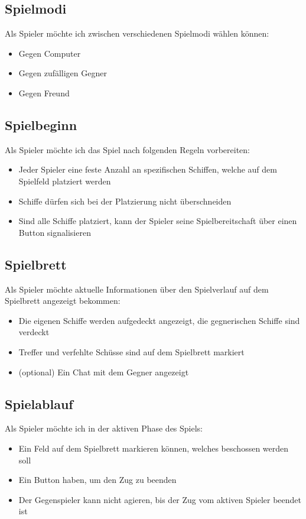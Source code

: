 \documentclass[a4paper, 10pt, conference]{IEEEtran}
\begin{document}
\subsection{Spielmodi}
Als Spieler möchte ich zwischen verschiedenen Spielmodi wählen können:
\begin{itemize}
	\item Gegen Computer
	\item Gegen zufälligen Gegner
	\item Gegen Freund
\end{itemize}

\subsection{Spielbeginn}
Als Spieler möchte ich das Spiel nach folgenden Regeln vorbereiten:
\begin{itemize}
	\item Jeder Spieler eine feste Anzahl an spezifischen Schiffen, welche auf dem Spielfeld platziert werden
	\item Schiffe dürfen sich bei der Platzierung nicht überschneiden
	\item Sind alle Schiffe platziert, kann der Spieler seine Spielbereitschaft über einen Button signalisieren
\end{itemize}

\subsection{Spielbrett}
Als Spieler möchte aktuelle Informationen über den Spielverlauf auf dem Spielbrett angezeigt bekommen:
\begin{itemize}
	\item Die eigenen Schiffe werden aufgedeckt angezeigt, die gegnerischen Schiffe sind verdeckt
	\item Treffer und verfehlte Schüsse sind auf dem Spielbrett markiert
	\item (optional) Ein Chat mit dem Gegner angezeigt
\end{itemize}

\subsection{Spielablauf}
Als Spieler möchte ich in der aktiven Phase des Spiels:
\begin{itemize}
	\item Ein Feld auf dem Spielbrett markieren können, welches beschossen werden soll
	\item Ein Button haben, um den Zug zu beenden
	\item Der Gegenspieler kann nicht agieren, bis der Zug vom aktiven Spieler beendet ist
\end{itemize}
\end{document}
